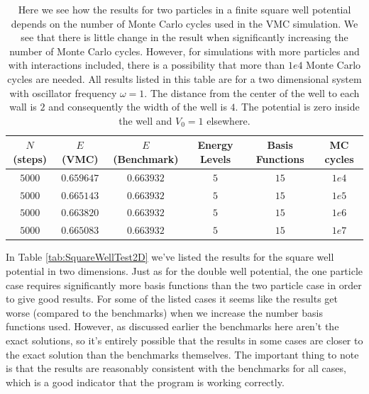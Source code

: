 \documentclass[../main.tex]{subfiles}
\begin{document}
\begin{table}[!ht]
  \centering
  \begin{tabular}{ | c | c | c | c | c | c | }
    \hline
    $N$ (steps) & $E$ (VMC) & $E$ (Benchmark) &  Energy Levels & Basis Functions & MC cycles\\*
    \hline
    $5000$ & $0.659647$ & $0.663932$ & $5$ & $15$ & $1e4$ \\*
    \hline
    $5000$ & $0.665143$ & $0.663932$ & $5$ & $15$ & $1e5$ \\*
    \hline
    $5000$ & $0.663820$ & $0.663932$ & $5$ & $15$ & $1e6$ \\*
    \hline
    $5000$ & $0.665083$ & $0.663932$ & $5$ & $15$ & $1e7$ \\*
    \hline
  \end{tabular}
  \caption{Here we see how the results for two particles in a finite square well potential depends on the number of Monte Carlo cycles used in the VMC simulation. We see that there is little change in the result when significantly increasing the number of Monte Carlo cycles. However, for simulations with more particles and with interactions included, there is a possibility that more than $1e4$ Monte Carlo cycles are needed. All results listed in this table are for a two dimensional system with oscillator frequency $\omega = 1$. The distance from the center of the well to each wall is $2$ and consequently the width of the well is $4$. The potential is zero inside the well and $V_0 = 1$ elsewhere.}
  \label{tab:SquareWellMCcyclesTest2D}
\end{table}

In Table \ref{tab:SquareWellTest2D} we've listed the results for the square well potential in two dimensions. Just as for the double well potential, the one particle case requires significantly more basis functions than the two particle case in order to give good results. For some of the listed cases it seems like the results get worse (compared to the benchmarks) when we increase the number basis functions used. However, as discussed earlier the benchmarks here aren't the exact solutions, so it's entirely possible that the results in some cases are closer to the exact solution than the benchmarks themselves. The important thing to note is that the results are reasonably consistent with the benchmarks for all cases, which is a good indicator that the program is working correctly.
\end{document}

